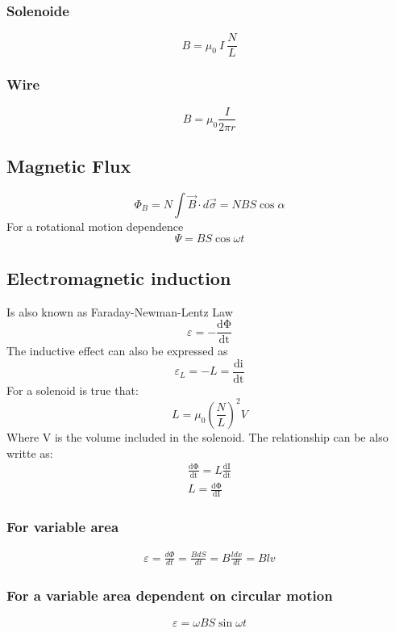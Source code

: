 \documentclass[Master.tex]{subfiles}
\begin{document}
\begin{multicols}{2}
				   \subsubsection{Solenoide}

						    \[
								     B = \mu _{0}~I~\frac{N}{L}
						    \]

				   \subsubsection{Wire}
						    \[
								     B = \mu_{0}\frac{I}{2\pi r}
						    \]
		  \subsection{Magnetic Flux}
				   \[
						    \Phi _{B} = N \int \vec{B} \cdot d \vec{\sigma} = NBS \cos \alpha
				   \]
				   For a rotational motion dependence
				   \[
						    \Psi = BS\cos \omega t
				   \]

		  \subsection{Electromagnetic induction}
				   Is also known as Faraday-Newman-Lentz Law
				   \[
						    \varepsilon = - \frac{\mathrm{d\Phi}}{\mathrm{dt}}
				   \]
				   The inductive effect can also be expressed as
				   \[
						    \varepsilon_{L} = -L = \frac{\mathrm{di}}{\mathrm{dt}}
				   \]
				   For a solenoid is true that:
				   \[
						    L = \mu _{0} \left(  \frac{N}{L}   \right) ^2 V
				   \]
				   Where V is the volume included in the solenoid. The relationship can be also
				   writte as:
				   \begin{gather*}
						    \frac{\mathrm{d\Phi }}{\mathrm{dt}} = L \frac{\mathrm{dI}}{\mathrm{dt}} \\
						    L = \frac{\mathrm{d\Phi }}{\mathrm{dI}}
				   \end{gather*}
				   \subsubsection{For variable area}
						    \begin{gather*}
								     \varepsilon = \frac{d\Phi }{dt} = \frac{B dS}{dt} = B \frac{l dx}{dt} =  B l v
						    \end{gather*}

				   \subsubsection{For a variable area dependent on circular motion}
						    \[
								     \varepsilon = \omega BS \sin \omega t
						    \]


\end{multicols}
\end{document}
